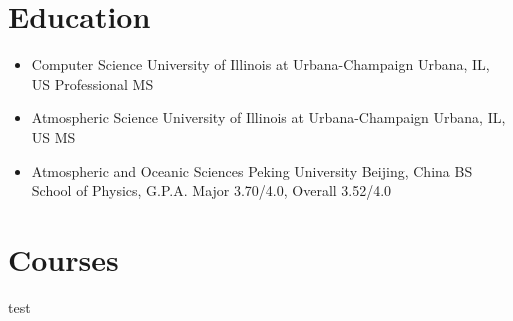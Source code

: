 \documentclass[11pt,a4paper,sans]{moderncv}        %
\begin{document}
\makecvtitle

\vspace{-50pt}
\section{Education}
\begin{itemize}
	\item {
	      {Computer Science}
	      {University of Illinois at Urbana-Champaign}
	      {Urbana, IL, US}
	      {Professional MS}
	      {}
	      }
	      
	\item {
	      {Atmospheric Science}
	      {University of Illinois at Urbana-Champaign}
	      {Urbana, IL, US}
	      {MS}
	      {}
	      }
	      
	\item {
	      {Atmospheric and Oceanic Sciences}
	      {Peking University}
	      {Beijing, China}
	      {BS}
	      {School of Physics, G.P.A. Major 3.70/4.0, Overall 3.52/4.0}
	      }
\end{itemize}

\section{Courses}
test
\end{document}
